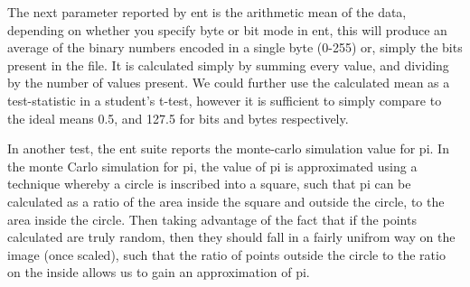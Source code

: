 \documentclass{IEEEtran}
\begin{document}
The next parameter reported by ent is the arithmetic mean of the data, depending on whether you specify byte or bit mode in ent, this will produce an average of the binary numbers encoded in a single byte (0-255) or, simply the bits present in the file. It is calculated simply by summing every value, and dividing by the number of values present. We could further use the calculated mean as a test-statistic in a student's t-test, however it is sufficient to simply compare to the ideal means 0.5, and 127.5 for bits and bytes respectively.

In another test, the ent suite reports the monte-carlo simulation value for pi. In the monte Carlo simulation for pi, the value of pi is approximated using a technique whereby a circle is inscribed into a square, such that pi can be calculated as a ratio of the area inside the square and outside the circle, to the area inside the circle. Then taking advantage of the fact that if the points calculated are truly random, then they should fall in a fairly unifrom way on the image (once scaled), such that the ratio of points outside the circle to the ratio on the inside allows us to gain an approximation of pi. 






\end{document}

